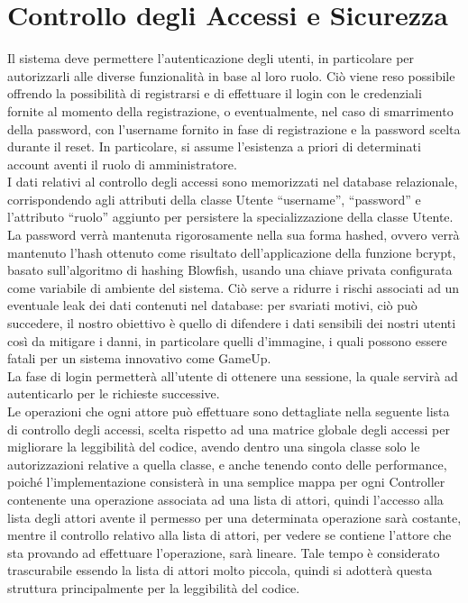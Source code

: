 \section{Controllo degli Accessi e Sicurezza}
Il sistema deve permettere l’autenticazione degli utenti, in particolare per autorizzarli alle diverse funzionalità in base al loro ruolo. Ciò viene reso possibile offrendo la possibilità di registrarsi e di effettuare il login con le credenziali fornite al momento della registrazione, o eventualmente, nel caso di smarrimento della password, con l’username fornito in fase di registrazione e la password scelta durante il reset. In particolare, si assume l’esistenza a priori di determinati account aventi il ruolo di amministratore.\\
I dati relativi al controllo degli accessi sono memorizzati nel database relazionale, corrispondendo agli attributi della classe Utente “username”, “password” e l’attributo “ruolo” aggiunto per persistere la specializzazione della classe Utente. La password verrà mantenuta rigorosamente nella sua forma hashed, ovvero verrà mantenuto l’hash ottenuto come risultato dell’applicazione della funzione bcrypt, basato sull’algoritmo di hashing Blowfish, usando una chiave privata configurata come variabile di ambiente del sistema. Ciò serve a ridurre i rischi associati ad un eventuale leak dei dati contenuti nel database: per svariati motivi, ciò può succedere, il nostro obiettivo è quello di difendere i dati sensibili dei nostri utenti così da mitigare i danni, in particolare quelli d’immagine, i quali possono essere fatali per un sistema innovativo come GameUp.\\
La fase di login permetterà all’utente di ottenere una sessione, la quale servirà ad autenticarlo per le richieste successive.\\
Le operazioni che ogni attore può effettuare sono dettagliate nella seguente lista di controllo degli accessi, scelta rispetto ad una matrice globale degli accessi per migliorare la leggibilità del codice, avendo dentro una singola classe solo le autorizzazioni relative a quella classe, e anche tenendo conto delle performance, poiché l’implementazione consisterà in una semplice mappa per ogni Controller contenente una operazione associata ad una lista di attori, quindi l’accesso alla lista degli attori avente il permesso per una determinata operazione sarà costante, mentre il controllo relativo alla lista di attori, per vedere se contiene l’attore che sta provando ad effettuare l’operazione, sarà lineare. Tale tempo è considerato trascurabile essendo la lista di attori molto piccola, quindi si adotterà questa struttura principalmente per la leggibilità del codice.\\
